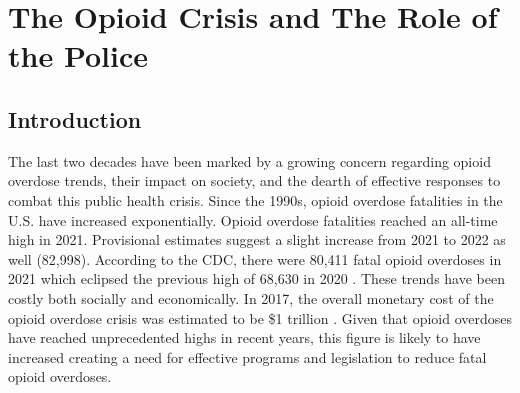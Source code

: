 \chapter{The Opioid Crisis and The Role of the Police}

\section{\centering Introduction}

The last two decades have been marked by a growing concern regarding opioid overdose trends, their impact on society, and the dearth of effective responses to combat this public health crisis. Since the 1990s, opioid overdose fatalities in the U.S. have increased exponentially. Opioid overdose fatalities reached an all-time high in 2021. Provisional estimates suggest a slight increase from 2021 to 2022 as well (82,998). According to the CDC, there were 80,411 fatal opioid overdoses in 2021 which eclipsed the previous high of 68,630 in 2020 \parencite{national_institute_on_drug_abuse_drug_2023}. These trends have been costly both socially and economically. In 2017, the overall monetary cost of the opioid overdose crisis was estimated to be \$1 trillion \parencite{luo_state-level_2021}. Given that opioid overdoses have reached unprecedented highs in recent years, this figure is likely to have increased creating a need for effective programs and legislation to reduce fatal opioid overdoses.



